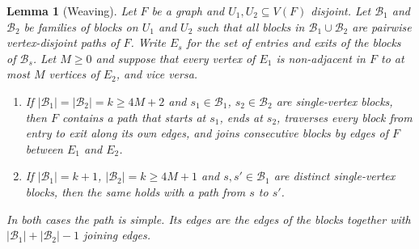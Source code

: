 \documentclass[11pt]{article}
\newtheorem{lemma}[theorem]{Lemma}
\theoremstyle{definition}
\begin{document}
\begin{lemma}[Weaving]\label{lem:weave}
Let $F$ be a graph and $U_1,U_2\subseteq V(F)$ disjoint. Let $\mathcal B_1$ and $\mathcal B_2$ be families of blocks on $U_1$ and $U_2$ such that all blocks in $\mathcal B_1\cup\mathcal B_2$ are pairwise vertex-disjoint paths of $F$. Write $E_s$ for the set of entries and exits of the blocks of $\mathcal B_s$. Let $M\ge0$ and suppose that every vertex of $E_1$ is non-adjacent in $F$ to at most $M$ vertices of $E_2$, and vice versa.
\begin{enumerate}[label=\textup{(\roman*)},nosep]
\item If $|\mathcal B_1|=|\mathcal B_2|=k\ge4M+2$ and $s_1\in\mathcal B_1$, $s_2\in\mathcal B_2$ are single-vertex blocks, then $F$ contains a path that starts at $s_1$, ends at $s_2$, traverses every block from entry to exit along its own edges, and joins consecutive blocks by edges of $F$ between $E_1$ and $E_2$.
\item If $|\mathcal B_1|=k+1$, $|\mathcal B_2|=k\ge4M+1$ and $s,s'\in\mathcal B_1$ are distinct single-vertex blocks, then the same holds with a path from $s$ to $s'$.
\end{enumerate}
In both cases the path is simple. Its edges are the edges of the blocks together with $|\mathcal B_1|+|\mathcal B_2|-1$ joining edges.
\end{lemma}
\end{document}
